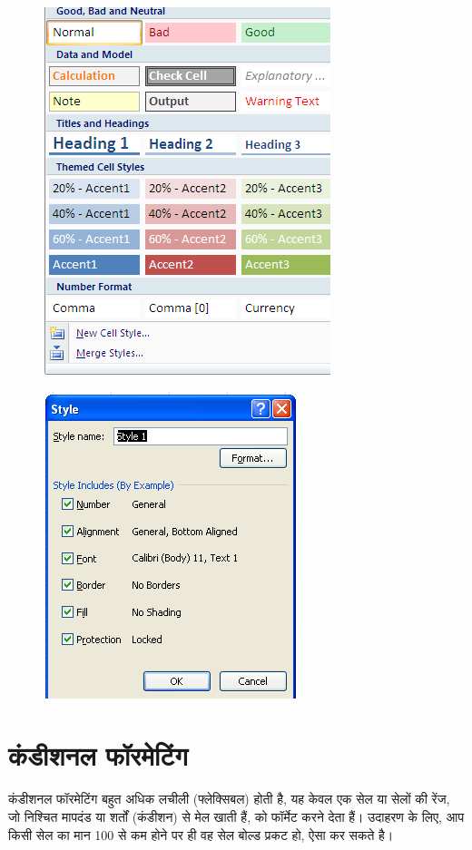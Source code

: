\begin{figure}[H]
\centering
\includegraphics[scale=.5]{src/images/chapter2/chapter2_fig19.png}
\end{figure}

\begin{figure}[H]
\centering
\includegraphics[scale=.55]{src/images/chapter2/chapter2_fig20.png}
\end{figure}

\section{कंडीशनल फॉरमेटिंग}\label{id-2.12}

कंडीशनल फॉरमेटिंग बहुत अधिक लचीली (फ्लेक्सिबल) होती है, यह केवल एक सेल या सेलों की रेंज, जो निश्चित मापदंड या शर्तों (कंडीशन) से मेल खाती हैं, को फॉर्मेट करने देता हैं। उदाहरण के लिए, आप किसी सेल का मान 100 से कम होने पर ही वह सेल बोल्ड प्रकट हो, ऐसा कर सकते है।

